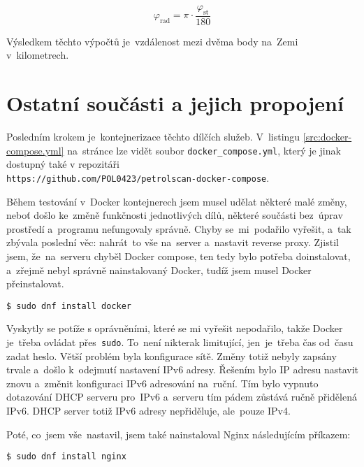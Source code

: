 \begin{equation}
    \label{eq:deg-to-rad}
    \varphi_{\text{rad}} = \pi \cdot \frac{\varphi_{\text{st}}}{180}
\end{equation}

Výsledkem těchto výpočtů je~vzdálenost mezi dvěma body na~Zemi v~kilometrech.

\section{Ostatní součásti a jejich propojení}
\label{sec:other-parts-and-stitching-services-together}

Posledním krokem je~kontejnerizace těchto dílčích služeb. V~listingu
\ref{src:docker-compose.yml} na~stránce \pageref{src:docker-compose.yml}
lze vidět soubor \texttt{docker\_compose.yml}, který je jinak dostupný
také v repozitáři\\
\texttt{https://github.com/POL0423/petrolscan-docker-compose}.

Během testování v~Docker kontejnerech jsem musel udělat některé malé
změny, neboť došlo ke~změně funkčnosti jednotlivých dílů, některé součásti
bez~úprav prostředí a~programu nefungovaly správně. Chyby se~mi~podařilo
vyřešit, a~tak zbývala poslední věc: nahrát~to vše na~server a~nastavit
reverse proxy. Zjistil jsem, že~na~serveru chyběl Docker compose,
ten tedy bylo potřeba doinstalovat, a~zřejmě nebyl správně nainstalovaný
Docker, tudíž jsem musel Docker přeinstalovat.

\begin{verbatim}
$ sudo dnf install docker
\end{verbatim}

Vyskytly se potíže s oprávněními, které se mi vyřešit nepodařilo,
takže Docker je~třeba ovládat přes~\texttt{sudo}. To~není nikterak
limitující, jen~je~třeba čas od~času zadat heslo. Větší problém byla
konfigurace sítě. Změny totiž nebyly zapsány trvale a~došlo k~odejmutí
nastavení IPv6 adresy. Řešením bylo IP adresu nastavit znovu a~změnit
konfiguraci IPv6 adresování na~ruční. Tím bylo vypnuto dotazování DHCP
serveru pro~IPv6 a~serveru tím pádem zůstává ručně přidělená IPv6.
DHCP server totiž IPv6 adresy nepřiděluje, ale~pouze IPv4.

Poté, co~jsem vše~nastavil, jsem také nainstaloval Nginx následujícím
příkazem:

\begin{verbatim}
$ sudo dnf install nginx
\end{verbatim}

